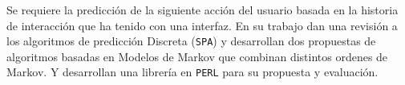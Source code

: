 {
	Se requiere la predicción de la siguiente acción del usuario basada en la historia de interacción que ha tenido con una interfaz. 
	En su trabajo dan una revisión a los algoritmos de predicción Discreta (\texttt{SPA}) y desarrollan dos propuestas de algoritmos basadas en Modelos de Markov que combinan distintos ordenes de Markov. Y desarrollan una librería en \texttt{PERL} para su propuesta y evaluación.
	
	
	
	
	
	
	
	}